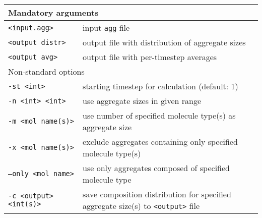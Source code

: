 \noindent
\begin{longtable}{p{}p{}}
  \toprule
  \multicolumn{2}{l}{Mandatory arguments} \\
  \midrule
  \texttt{<input.agg>} & input \texttt{agg} file \\
  \texttt{<output distr>} & output file with distribution of aggregate
    sizes \\
  \texttt{<output avg>} & output file with per-timestep averages \\
  \toprule
  \multicolumn{2}{l}{Non-standard options} \\
  \midrule
  \texttt{-st <int>} & starting timestep for calculation (default: 1) \\
  \texttt{-n <int> <int>} & use aggregate sizes in given range \\
  \texttt{-m <mol name(s)>} & use number of specified molecule type(s) as
    aggregate size \\
  \texttt{-x <mol name(s)>} & exclude aggregates containing only specified
    molecule type(s) \\
  \texttt{--only <mol name>} & use only aggregates composed of specified
    molecule type \\
  \texttt{-c <output> <int(s)>} & save composition distribution for
    specified aggregate size(s) to \texttt{<output>} file \\
  \bottomrule
\end{longtable}


